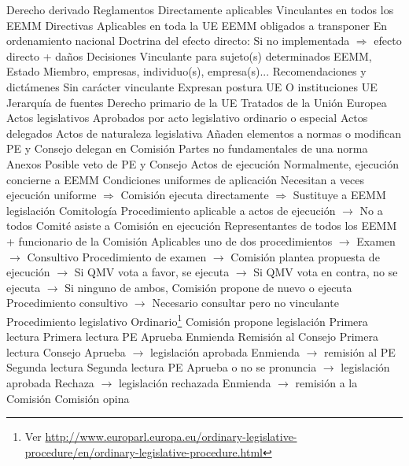 \documentclass{nuevotema}
\begin{document}
\begin{esquemal}
		\2 Derecho derivado
			\3 Reglamentos
				\4 Directamente aplicables
				\4 Vinculantes en todos los EEMM
			\3 Directivas
				\4 Aplicables en toda la UE
				\4 EEMM obligados a transponer
				\4[] En ordenamiento nacional
				\4 Doctrina del efecto directo:
				\4[] Si no implementada $\Rightarrow$ efecto directo + daños
			\3 Decisiones
				\4 Vinculante para sujeto(s) determinados
				\4[] EEMM, Estado Miembro, empresas, individuo(s), empresa(s)...
			\3 Recomendaciones y dictámenes
				\4 Sin carácter vinculante
				\4 Expresan postura UE O instituciones UE
		\2 Jerarquía de fuentes
			\3[1] Derecho primario de la UE
				\4 Tratados de la Unión Europea
			\3[2] Actos legislativos
				\4 Aprobados por acto legislativo ordinario o especial
			\3[3] Actos delegados
				\4 Actos de naturaleza legislativa
				\4[] Añaden elementos a normas o modifican
				\4 PE y Consejo delegan en Comisión
				\4[] Partes no fundamentales de una norma
				\4[] Anexos
				\4 Posible veto de PE y Consejo
			\3[4] Actos de ejecución
				\4 Normalmente, ejecución concierne a EEMM
				\4 Condiciones uniformes de aplicación
				\4[] Necesitan a veces ejecución uniforme
				\4[] $\Rightarrow$ Comisión ejecuta directamente
				\4[] $\Rightarrow$ Sustituye a EEMM legislación
				\4 Comitología
				\4[] Procedimiento aplicable a actos de ejecución
				\4[] $\to$ No a todos
				\4[] Comité asiste a Comisión en ejecución
				\4[] Representantes de todos los EEMM
				\4[] + funcionario de la Comisión
				\4[] Aplicables uno de dos procedimientos
				\4[] $\to$ Examen
				\4[] $\to$ Consultivo
				\4[] Procedimiento de examen
				\4[] $\to$ Comisión plantea propuesta de ejecución
				\4[] $\to$ Si QMV vota a favor, se ejecuta
				\4[] $\to$ Si QMV vota en contra, no se ejecuta
				\4[] $\to$ Si ninguno de ambos, Comisión propone de nuevo o ejecuta
				\4[] Procedimiento consultivo
				\4[] $\to$ Necesario consultar pero no vinculante
		\2 Procedimiento legislativo
			\3 Ordinario\footnote{Ver \url{http://www.europarl.europa.eu/ordinary-legislative-procedure/en/ordinary-legislative-procedure.html}}
				\4[0] Comisión propone legislación
				\4[1] Primera lectura
				\4[] Primera lectura PE
				\4[] Aprueba
				\4[] Enmienda
				\4[$\to$] Remisión al Consejo
				\4[] Primera lectura Consejo
				\4[] Aprueba $\to$ legislación aprobada
				\4[] Enmienda $\to$ remisión al PE
				\4[2] Segunda lectura
				\4[] Segunda lectura PE
				\4[] Aprueba o no se pronuncia $\to$ legislación aprobada
				\4[] Rechaza $\to$ legislación rechazada
				\4[] Enmienda $\to$ remisión a la Comisión
				\4[] Comisión opina

\end{esquemal}
\end{document}
